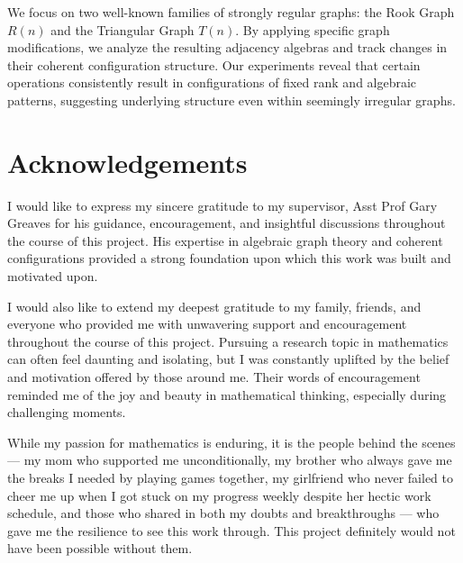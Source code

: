 \documentclass[11pt,a4paper]{article}
\theoremstyle{remark}
\begin{document}
We focus on two well-known families of strongly regular graphs: the Rook Graph $R(n)$ and the Triangular Graph $T(n)$. By applying specific graph modifications, we analyze the resulting adjacency algebras and track changes in their coherent configuration structure. Our experiments reveal that certain operations consistently result in configurations of fixed rank and algebraic patterns, suggesting underlying structure even within seemingly irregular graphs.

\vspace{1cm}


\newpage
\section*{Acknowledgements}
I would like to express my sincere gratitude to my supervisor, Asst Prof Gary Greaves for his guidance, encouragement, and insightful discussions throughout the course of this project. His expertise in algebraic graph theory and coherent configurations provided a strong foundation upon which this work was built and motivated upon.

I would also like to extend my deepest gratitude to my family, friends, and everyone who provided me with unwavering support and encouragement throughout the course of this project. Pursuing a research topic in mathematics can often feel daunting and isolating, but I was constantly uplifted by the belief and motivation offered by those around me. Their words of encouragement reminded me of the joy and beauty in mathematical thinking, especially during challenging moments.

While my passion for mathematics is enduring, it is the people behind the scenes — my mom who supported me unconditionally, my brother who always gave me the breaks I needed by playing games together, my girlfriend who never failed to cheer me up when I got stuck on my progress weekly despite her hectic work schedule, and those who shared in both my doubts and breakthroughs — who gave me the resilience to see this work through. This project definitely would not have been possible without them.

\newpage
\tableofcontents
\newpage


\newpage


\newpage


\newpage


\newpage


\newpage


\newpage




\clearpage

\end{document}
